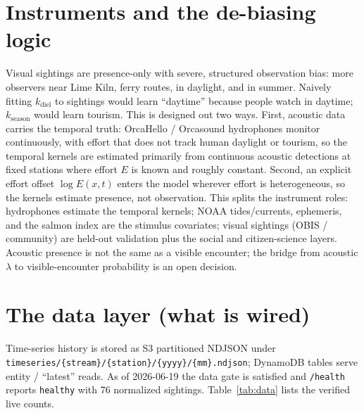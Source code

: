 \documentclass[11pt]{article}
\begin{document}
\section{Instruments and the de-biasing logic}
Visual sightings are presence-only with severe, structured observation bias:
more observers near Lime Kiln, ferry routes, in daylight, and in summer. Naively
fitting $k_{\text{diel}}$ to sightings would learn ``daytime'' because people
watch in daytime; $k_{\text{season}}$ would learn tourism. This is designed out
two ways. First, acoustic data carries the temporal truth: OrcaHello /
Orcasound hydrophones monitor continuously, with effort that does not track human
daylight or tourism, so the temporal kernels are estimated primarily from
continuous acoustic detections at fixed stations where effort $E$ is known and
roughly constant. Second, an explicit effort offset $\log E(x,t)$ enters the
model wherever effort is heterogeneous, so the kernels estimate presence, not
observation. This splits the instrument roles: hydrophones estimate the temporal
kernels; NOAA tides/currents, ephemeris, and the salmon index are the stimulus
covariates; visual sightings (OBIS / community) are held-out validation plus the
social and citizen-science layers. Acoustic presence is not the same as a
visible encounter; the bridge from acoustic $\lambda$ to visible-encounter
probability is an open decision.

\section{The data layer (what is wired)}
\label{sec:data}
Time-series history is stored as S3 partitioned NDJSON under
\texttt{timeseries/\{stream\}/\{station\}/\{yyyy\}/\{mm\}.ndjson}; DynamoDB tables
serve entity / ``latest'' reads. As of 2026-06-19 the data gate is satisfied and
\texttt{/health} reports \texttt{healthy} with 76 normalized sightings.
Table~\ref{tab:data} lists the verified live counts.
\end{document}
